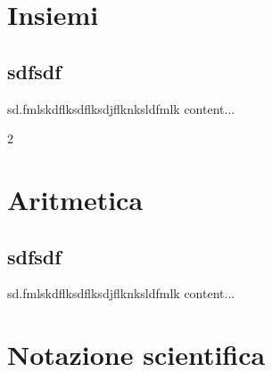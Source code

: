 \documentclass[
finale,
ssectnum,
]{DossierExMathIta}
\author{CPT}
\date{2020}
\begin{document}
\setlength{\columnsep}{0.6cm}
\indice


\section{Insiemi}
\subsection{sdfsdf}

\begin{questions}
	\question
	sd.fmlskdflksdflksdjflknksldfmlk
	content...
\end{questions}2


\exnewpage



\section{Aritmetica}

\exnewpage
\subsection{sdfsdf}

\begin{questions}
	\question
	sd.fmlskdflksdflksdjflknksldfmlk
	content...
\end{questions}
\section{Notazione scientifica}

\end{document}
